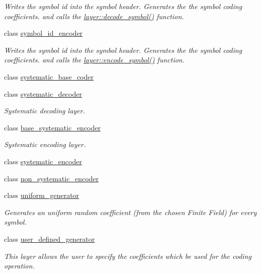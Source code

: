 \begin{DoxyCompactItemize}
\begin{DoxyCompactList}\small\item\em Writes the symbol id into the symbol header. Generates the the symbol coding coefficients. and calls the \hyperlink{group__decoder__api_gae28d93bf78534b4f4f4052ad6b1f7a4d}{layer\-::decode\-\_\-symbol()} function. \end{DoxyCompactList}\item 
class \hyperlink{classkodo_1_1symbol__id__encoder}{symbol\-\_\-id\-\_\-encoder}
\begin{DoxyCompactList}\small\item\em Writes the symbol id into the symbol header. Generates the the symbol coding coefficients. and calls the \hyperlink{group__encoder__api_gaf28d3c1b82242263733ed082b1e10915}{layer\-::encode\-\_\-symbol()} function. \end{DoxyCompactList}\item 
class \hyperlink{classkodo_1_1systematic__base__coder}{systematic\-\_\-base\-\_\-coder}
\item 
class \hyperlink{classkodo_1_1systematic__decoder}{systematic\-\_\-decoder}
\begin{DoxyCompactList}\small\item\em Systematic decoding layer. \end{DoxyCompactList}\item 
class \hyperlink{classkodo_1_1base__systematic__encoder}{base\-\_\-systematic\-\_\-encoder}
\begin{DoxyCompactList}\small\item\em Systematic encoding layer. \end{DoxyCompactList}\item 
class \hyperlink{classkodo_1_1systematic__encoder}{systematic\-\_\-encoder}
\item 
class \hyperlink{classkodo_1_1non__systematic__encoder}{non\-\_\-systematic\-\_\-encoder}
\item 
class \hyperlink{classkodo_1_1uniform__generator}{uniform\-\_\-generator}
\begin{DoxyCompactList}\small\item\em Generates an uniform random coefficient (from the chosen Finite Field) for every symbol. \end{DoxyCompactList}\item 
class \hyperlink{classkodo_1_1user__defined__generator}{user\-\_\-defined\-\_\-generator}
\begin{DoxyCompactList}\small\item\em This layer allows the user to specify the coefficients which be used for the coding operation. \end{DoxyCompactList}\item 

\end{DoxyCompactItemize}

